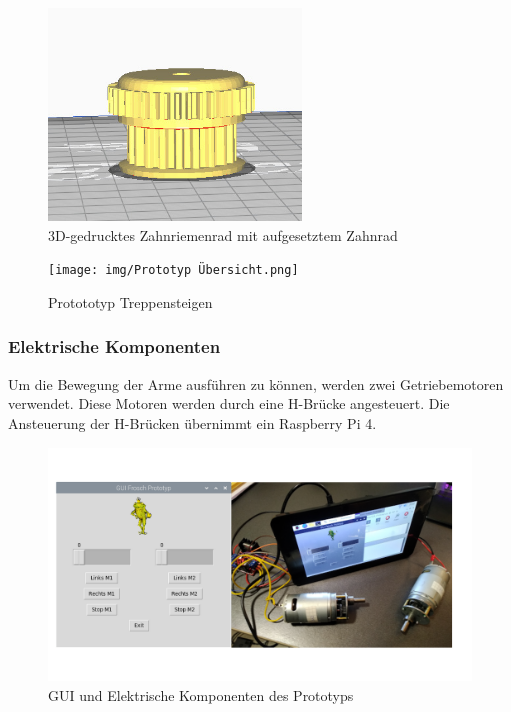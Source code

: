\begin{figure}[H]
  \includegraphics[width=0.6\textwidth]{img/Zahnrad gedruckt.JPG}
  \centering
  \caption{3D-gedrucktes Zahnriemenrad mit aufgesetztem Zahnrad}
  \label{fig:3d-gedrucktes-zahnriemenrad}
\end{figure}

\begin{figure}[H]
  \texttt{[image: img/Prototyp Übersicht.png]}
  \centering
  \caption{Protototyp Treppensteigen}
  \label{fig:prototyp-treppensteigen}
\end{figure}

\subsubsection{Elektrische Komponenten}
Um die Bewegung der Arme ausführen zu können, werden zwei Getriebemotoren verwendet. Diese Motoren werden durch eine H-Brücke angesteuert. Die Ansteuerung der H-Brücken übernimmt ein Raspberry Pi 4.

\begin{figure}[H]
  \includegraphics[width=\textwidth]{img/Funktionsmuster Treppensteigen/GUI.png}
  \centering
  \caption{GUI und Elektrische Komponenten des Prototyps}
  \label{fig:gui-prototyp}
\end{figure}

